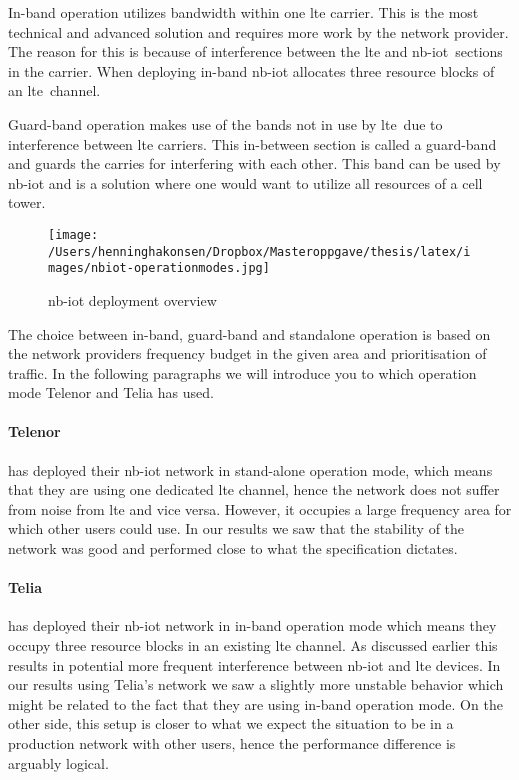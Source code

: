 \documentclass[USenglish]{ifimaster}  %
\begin{document}
In-band operation utilizes bandwidth within one \acrshort{lte} carrier. This is the most technical and advanced solution and requires more work by the network provider. The reason for this is because of interference between the \acrshort{lte} and \acrshort{nb-iot} sections in the carrier. When deploying in-band \acrshort{nb-iot} allocates three resource blocks of an \acrshort{lte} channel.

Guard-band operation makes use of the bands not in use by \acrshort{lte} due to interference between \acrshort{lte} carriers. This in-between section is called a guard-band and guards the carries for interfering with each other. This band can be used by \acrshort{nb-iot} and is a solution where one would want to utilize all resources of a cell tower.

\begin{figure}[ht]
  \centering\texttt{[image: /Users/henninghakonsen/Dropbox/Masteroppgave/thesis/latex/images/nbiot-operationmodes.jpg]}
  \caption[\acrshort{nb-iot} deployment overview]{\acrshort{nb-iot} deployment overview \cite{online:legacyWire}}
  \label{figure:nbiot-operationmodes}
\end{figure}

The choice between in-band, guard-band and standalone operation is based on the network providers frequency budget in the given area and prioritisation of traffic. In the following paragraphs we will introduce you to which operation mode Telenor and Telia has used.

\paragraph{Telenor} has deployed their \acrshort{nb-iot} network in stand-alone operation mode, which means that they are using one dedicated \acrshort{lte} channel\cite{person:ola}, hence the network does not suffer from noise from \acrshort{lte} and vice versa. However, it occupies a large frequency area for which other users could use. In our results we saw that the stability of the network was good and performed close to what the specification dictates.

\paragraph{Telia} has deployed their \acrshort{nb-iot} network in in-band operation mode which means they occupy three resource blocks in an existing \acrshort{lte} channel. As discussed earlier this results in potential more frequent interference between \acrshort{nb-iot} and \acrshort{lte} devices. In our results using Telia's network we saw a slightly more unstable behavior which might be related to the fact that they are using in-band operation mode. On the other side, this setup is closer to what we expect the situation to be in a production network with other users, hence the performance difference is arguably logical.
\end{document}
